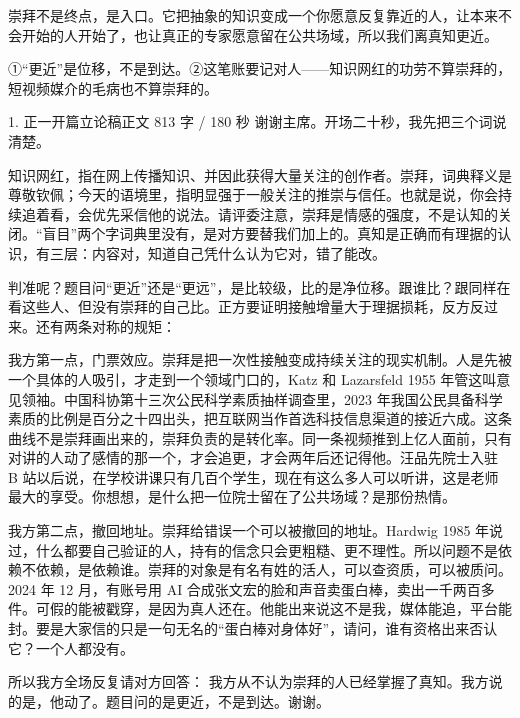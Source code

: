 \documentclass[script,pro]{debate}
\begin{document}
\debatetitle
\begin{thesisbox}[全场一句话立论]崇拜不是终点，是入口。它把抽象的知识变成一个你愿意反复靠近的人，让本来不会开始的人开始了，也让真正的专家愿意留在公共场域，所以我们离真知更近。\end{thesisbox}
\begin{thesisbox}[全场只守两句话]①“更近”是位移，不是到达。②这笔账要记对人——知识网红的功劳不算崇拜的，短视频媒介的毛病也不算崇拜的。\end{thesisbox}
\begin{speech}{1. 正一开篇立论稿}{正文 813 字 / 180 秒}
谢谢主席。开场二十秒，我先把三个词说清楚。

知识网红，指在网上传播知识、并因此获得大量关注的创作者。崇拜，词典释义是尊敬钦佩；今天的语境里，指明显强于一般关注的推崇与信任。也就是说，你会持续追着看，会优先采信他的说法。请评委注意，崇拜是情感的强度，不是认知的关闭。“盲目”两个字词典里没有，是对方要替我们加上的。真知是正确而有理据的认识，有三层：内容对，知道自己凭什么认为它对，错了能改。

判准呢？题目问“更近”还是“更远”，是比较级，比的是净位移。跟谁比？跟同样在看这些人、但没有崇拜的自己比。正方要证明接触增量大于理据损耗，反方反过来。还有两条对称的规矩：

我方第一点，门票效应。崇拜是把一次性接触变成持续关注的现实机制。人是先被一个具体的人吸引，才走到一个领域门口的，Katz 和 Lazarsfeld 1955 年管这叫意见领袖。中国科协第十三次公民科学素质抽样调查里，2023 年我国公民具备科学素质的比例是百分之十四出头，把互联网当作首选科技信息渠道的接近六成。这条曲线不是崇拜画出来的，崇拜负责的是转化率。同一条视频推到上亿人面前，只有对讲的人动了感情的那一个，才会追更，才会两年后还记得他。汪品先院士入驻 B 站以后说，在学校讲课只有几百个学生，现在有这么多人可以听讲，这是老师最大的享受。你想想，是什么把一位院士留在了公共场域？是那份热情。

我方第二点，撤回地址。崇拜给错误一个可以被撤回的地址。Hardwig 1985 年说过，什么都要自己验证的人，持有的信念只会更粗糙、更不理性。所以问题不是依赖不依赖，是依赖谁。崇拜的对象是有名有姓的活人，可以查资质，可以被质问。2024 年 12 月，有账号用 AI 合成张文宏的脸和声音卖蛋白棒，卖出一千两百多件。可假的能被戳穿，是因为真人还在。他能出来说这不是我，媒体能追，平台能封。要是大家信的只是一句无名的“蛋白棒对身体好”，请问，谁有资格出来否认它？一个人都没有。

所以我方全场反复请对方回答： 我方从不认为崇拜的人已经掌握了真知。我方说的是，他动了。题目问的是更近，不是到达。谢谢。

\begin{contingency}
\end{contingency}
\end{speech}
\end{document}
